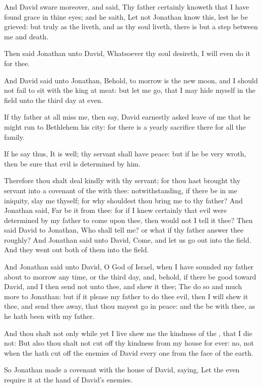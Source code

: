 \Verse And David sware moreover, and said, Thy father certainly knoweth that I have found grace in thine eyes; and he saith, Let not Jonathan know this, lest he be grieved: but truly as the \LORD liveth, and as thy soul liveth, there is but a step between me and death.

\Verse Then said Jonathan unto David, Whatsoever thy soul desireth, I will even do it for thee.

\Verse And David said unto Jonathan, Behold, to morrow is the new moon, and I should not fail to sit with the king at meat: but let me go, that I may hide myself in the field unto the third day at even.

\Verse If thy father at all miss me, then say, David earnestly asked leave of me that he might run to Bethlehem his city: for there is a yearly sacrifice there for all the family.

\Verse If he say thus, It is well; thy servant shall have peace: but if he be very wroth, then be sure that evil is determined by him.

\Verse Therefore thou shalt deal kindly with thy servant; for thou hast brought thy servant into a covenant of the \LORD with thee: notwithstanding, if there be in me iniquity, slay me thyself; for why shouldest thou bring me to thy father?  \Verse And Jonathan said, Far be it from thee: for if I knew certainly that evil were determined by my father to come upon thee, then would not I tell it thee?  \Verse Then said David to Jonathan, Who shall tell me? or what if thy father answer thee roughly?  \Verse And Jonathan said unto David, Come, and let us go out into the field. And they went out both of them into the field.

\Verse And Jonathan said unto David, O \LORD God of Israel, when I have sounded my father about to morrow any time, or the third day, and, behold, if there be good toward David, and I then send not unto thee, and shew it thee; \Verse The \LORD do so and much more to Jonathan: but if it please my father to do thee evil, then I will shew it thee, and send thee away, that thou mayest go in peace: and the \LORD be with thee, as he hath been with my father.

\Verse And thou shalt not only while yet I live shew me the kindness of the \LORD, that I die not: \Verse But also thou shalt not cut off thy kindness from my house for ever: no, not when the \LORD hath cut off the enemies of David every one from the face of the earth.

\Verse So Jonathan made a covenant with the house of David, saying, Let the \LORD even require it at the hand of David's enemies.


